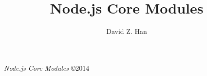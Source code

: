 \documentclass[12pt]{memoir}
\author{David Z. Han}
\title{Node.js Core Modules}
\date{}
\makeatletter
\def\maketitle{
  \null
  \thispagestyle{empty}
  \vfill
  \begin{center}
    \leavevmode
    \bfseries
    {\HUGE\raggedleft\@title\par}
    \hrulefill\par
    \normalfont
    {\Large\raggedleft \@author\par}
    \vskip 1cm
  \end{center}
  \vfill
  \null
  \cleardoublepage
  }
\makeatother
\begin{document}

\let\cleardoublepage\clearpage

\maketitle

\frontmatter

\null\vfill

\begin{flushleft}
    \textit{Node.js Core Modules}
    \copyright 2014
    \bigskip
\end{flushleft}

\let\cleardoublepage\clearpage

\mainmatter
\sloppy
\end{document}
